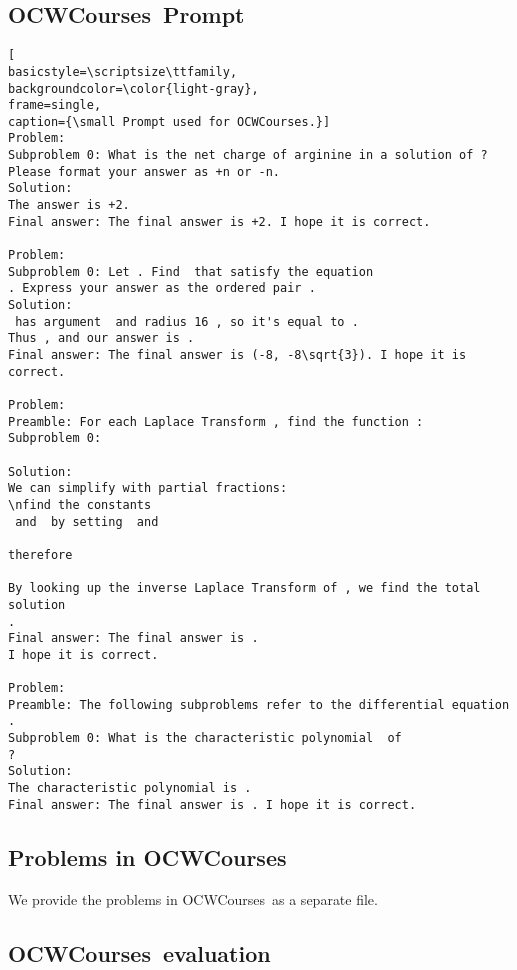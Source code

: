 \documentclass{article}
\newcommand{\ourbenchmark}[0]{{OCWCourses~}}
\begin{document}
\clearpage


\subsection{\ourbenchmark Prompt}

\begin{lstlisting}[
basicstyle=\scriptsize\ttfamily,
backgroundcolor=\color{light-gray},
frame=single,
caption={\small Prompt used for OCWCourses.}]
Problem:                                                                                
Subproblem 0: What is the net charge of arginine in a solution of ? 
Please format your answer as +n or -n.                           
Solution:
The answer is +2.                                                     
Final answer: The final answer is +2. I hope it is correct.

Problem:
Subproblem 0: Let . Find  that satisfy the equation 
. Express your answer as the ordered pair .         
Solution:
 has argument  and radius 16 , so it's equal to . 
Thus , and our answer is .
Final answer: The final answer is (-8, -8\sqrt{3}). I hope it is correct.

Problem:
Preamble: For each Laplace Transform , find the function :
Subproblem 0: 

Solution:
We can simplify with partial fractions:
\nfind the constants 
 and  by setting  and 

therefore

By looking up the inverse Laplace Transform of , we find the total 
solution 
.
Final answer: The final answer is . 
I hope it is correct.

Problem:
Preamble: The following subproblems refer to the differential equation 
.
Subproblem 0: What is the characteristic polynomial  of 
?
Solution:
The characteristic polynomial is .
Final answer: The final answer is . I hope it is correct.
\end{lstlisting}

\subsection{Problems in \ourbenchmark}

We provide the problems in \ourbenchmark as a separate file.




\subsection{\ourbenchmark evaluation}
\end{document}
